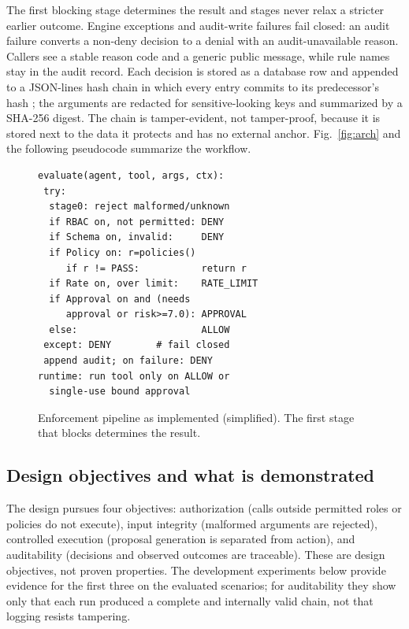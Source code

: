 \documentclass[3p,twocolumn]{elsarticle}
\begin{document}
The first blocking stage determines the result and stages never relax a stricter earlier outcome. Engine exceptions and audit-write failures fail closed: an audit failure converts a non-deny decision to a denial with an audit-unavailable reason. Callers see a stable reason code and a generic public message, while rule names stay in the audit record. Each decision is stored as a database row and appended to a JSON-lines hash chain in which every entry commits to its predecessor's hash \cite{schneier1999}; the arguments are redacted for sensitive-looking keys and summarized by a SHA-256 digest. The chain is tamper-evident, not tamper-proof, because it is stored next to the data it protects and has no external anchor. Fig.~\ref{fig:arch} and the following pseudocode summarize the workflow.

\begin{figure}[!tb]
\centering
\footnotesize
\begin{verbatim}
evaluate(agent, tool, args, ctx):
 try:
  stage0: reject malformed/unknown
  if RBAC on, not permitted: DENY
  if Schema on, invalid:     DENY
  if Policy on: r=policies()
     if r != PASS:           return r
  if Rate on, over limit:    RATE_LIMIT
  if Approval on and (needs
     approval or risk>=7.0): APPROVAL
  else:                      ALLOW
 except: DENY        # fail closed
 append audit; on failure: DENY
runtime: run tool only on ALLOW or
  single-use bound approval
\end{verbatim}
\caption{Enforcement pipeline as implemented (simplified). The first stage that blocks determines the result.}
\label{fig:pseudo}
\end{figure}

\subsection{Design objectives and what is demonstrated}
The design pursues four objectives: authorization (calls outside permitted roles or policies do not execute), input integrity (malformed arguments are rejected), controlled execution (proposal generation is separated from action), and auditability (decisions and observed outcomes are traceable). These are design objectives, not proven properties. The development experiments below provide evidence for the first three on the evaluated scenarios; for auditability they show only that each run produced a complete and internally valid chain, not that logging resists tampering.

\end{document}
